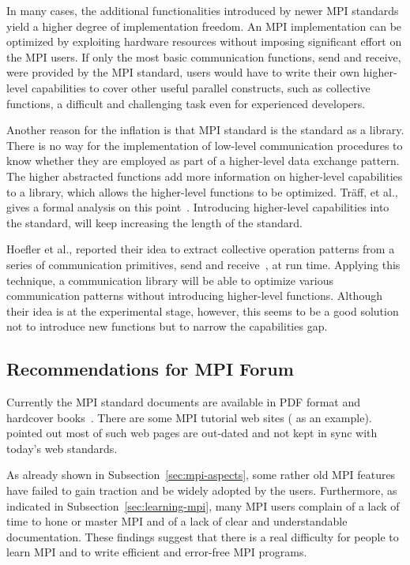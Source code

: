 \documentclass[preprint,5p,times]{elsarticle}
\begin{document}
{In many cases, the additional functionalities introduced by newer MPI standards yield
a higher degree of implementation freedom. An MPI implementation can be optimized by
exploiting hardware resources without imposing significant effort on the MPI
users. If only the most basic communication functions, send and receive, were
provided by the MPI standard, users would have to write their own higher-level
capabilities to cover other useful parallel constructs, such as collective
functions, a difficult and challenging task even for experienced developers.

Another reason for the inflation is that MPI standard is the standard
as a library. There is no way for the implementation of low-level communication procedures
to know whether they are employed as part of a higher-level data exchange
pattern. The higher abstracted
functions add more information on higher-level capabilities to a library, which
allows the higher-level functions to be optimized. Tr\"{a}ff, et al., gives
a formal analysis on this point~\cite{5184825}.
Introducing higher-level capabilities into the standard,
will keep increasing the length of the standard.

Hoefler et al., reported their idea to extract collective operation
patterns from a series of communication primitives, send and
receive~\cite{7842939}, at run time. Applying this technique, a
communication library will be able to optimize various communication
patterns without introducing higher-level functions.
Although their idea is at the experimental
stage, however, this seems to be a good solution not to introduce new
functions but to narrow the capabilities gap.

\subsection{Recommendations for MPI Forum}

Currently the MPI standard documents are available in PDF format and
hardcover books~\cite{mpi-hardcover}. There are some MPI tutorial web
sites (\cite{mpi-tutorial} as an example). \cite{mpi-tutorial-intro}
pointed out most of such web pages are out-dated and not
kept in sync with today's web standards.

As already shown in Subsection~\ref{sec:mpi-aspects}, some rather old MPI
features have failed to gain traction and be widely adopted by the users.
Furthermore, as indicated in Subsection~\ref{sec:learning-mpi}, many MPI users
complain of a lack of time to hone or master MPI and of a lack of clear
and understandable documentation. These findings suggest that there is a real
difficulty for people to learn MPI and to write efficient and error-free MPI programs.

}
\end{document}
